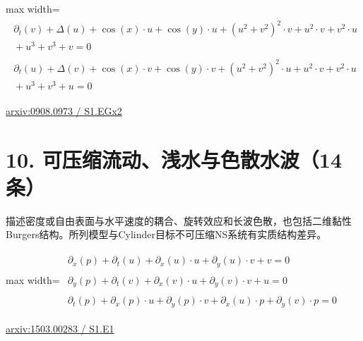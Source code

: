 \documentclass[UTF8,10pt,a4paper,fontset=mac]{ctexart}
\begin{document}
\begin{minipage}{\linewidth}\begin{center}\begin{adjustbox}{max width=\linewidth}$\displaystyle\begin{gathered}\begin{gathered}\partial_{t}(v)+\Delta(u)+\cos(x)\cdot u+\cos(y)\cdot u+(u^{2}+v^{2})^{2}\cdot v+u^{2}\cdot v+v^{2}\cdot u\\[-1pt]{}+u^{3}+v^{3}+v=0\end{gathered}\\[5pt]\begin{gathered}\partial_{t}(u)+\Delta(v)+\cos(x)\cdot v+\cos(y)\cdot v+(u^{2}+v^{2})^{2}\cdot u+u^{2}\cdot v+v^{2}\cdot u\\[-1pt]{}+u^{3}+v^{3}+u=0\end{gathered}\end{gathered}$\end{adjustbox}\end{center}{\small\href{https://arxiv.org/html/0908.0973#S1.EGx2}{arxiv:0908.0973 / S1.EGx2}}\par\end{minipage}\par\vspace{6mm}

\section*{10. 可压缩流动、浅水与色散水波（14条）}
描述密度或自由表面与水平速度的耦合、旋转效应和长波色散，也包括二维黏性Burgers结构。所列模型与Cylinder目标不可压缩NS系统有实质结构差异。\par\medskip

\begin{minipage}{\linewidth}\begin{center}\begin{adjustbox}{max width=\linewidth}$\displaystyle\begin{gathered}\begin{gathered}\partial_{x}(p)+\partial_{t}(u)+\partial_{x}(u)\cdot u+\partial_{y}(u)\cdot v+v=0\end{gathered}\\[5pt]\begin{gathered}\partial_{y}(p)+\partial_{t}(v)+\partial_{x}(v)\cdot u+\partial_{y}(v)\cdot v+u=0\end{gathered}\\[5pt]\begin{gathered}\partial_{t}(p)+\partial_{x}(p)\cdot u+\partial_{y}(p)\cdot v+\partial_{x}(u)\cdot p+\partial_{y}(v)\cdot p=0\end{gathered}\end{gathered}$\end{adjustbox}\end{center}{\small\href{https://arxiv.org/html/1503.00283#S1.E1}{arxiv:1503.00283 / S1.E1}}\par\end{minipage}\par\vspace{6mm}
\end{document}
